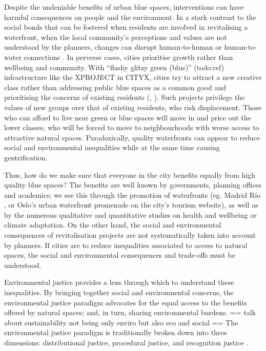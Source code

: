 \documentclass{article}
\begin{document}
Despite the undeniable benefits of urban blue spaces, interventions can have harmful consequences on people and the environment.
In a stark contrast to the social bonds that can be fostered when residents are involved in revitalising a waterfront, when the local community's perceptions and values are not understood by the planners, changes can disrupt human-to-human or human-to-water connections \parencite{toomey2021place}. In perverse cases, cities prioritise growth rather than wellbeing and community. With ``flashy glitzy green (blue)'' (todo:ref) infrastructure like the XPROJECT in CITYX, cities try to attract a new creative class rather than addressing public blue spaces as a common good and prioritising the concerns of existing residents (\cite{wessells2014urban}, \cite{anguelovski2020expanding}). 
Such projects privilege the values of new groups over that of existing residents, who risk displacement. Those who can afford to live near green or blue spaces will move in and price out the lower classes, who will be forced to move to neighbourhoods with worse access to attractive natural spaces. 
Paradoxically, quality waterfronts can appear to reduce social and environmental inequalities while at the same time causing gentrification. %

Thus, how do we make sure that everyone in the city benefits equally from high quality blue spaces? The benefits are well known by governments, planning offices and academics; we see this through the promotion of waterfronts (eg. Madrid Río \parencite{madridrio}, or Oslo's urban waterfront promenade \parencite{visitoslo} on the city's tourism website), as well as by the numerous qualitative and quantitative studies on health and wellbeing or climate adaptation.
On the other hand, the social and environmental consequences of revitalisation projects are not systematically taken into account by planners. If cities are to reduce inequalities associated to access to natural spaces, the social and environmental consequences and trade-offs must be understood.

Environmental justice provides a lens through which to understand these inequalities. By bringing together social and environmental concerns, the environmental justice paradigm advocates for the equal access to the benefits offered by natural spaces; and, in turn, sharing environmental burdens. 
== talk about sustainability not being only enviro but also eco and social ==
The environmental justice paradigm is traditionally broken down into three dimensions: distributional justice, procedural justice, and recognition justice \parencite{todo:cite schlosberg}.
\end{document}
